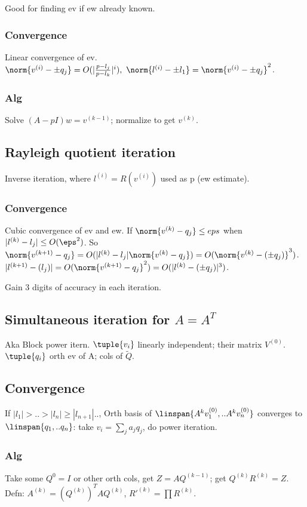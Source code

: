 \documentclass[10pt]{amsart}
\begin{document}
Good for finding ev if ew already known.

\subsubsection{Convergence}
Linear convergence of ev. \\
$\norm{v^{(i)} - \pm q_{j}} = O(|\frac{p-l_{j}}{p-l_{k}}|^{i}),\ \norm{l^{(i)} - \pm l_{1}} = \norm{v^{(i)} - \pm q_{j}}^{2}$.

\subsubsection{Alg}
Solve $(A-pI)w = v^{(k-1)}$; normalize to get $v^{(k)}$.

\subsection{Rayleigh quotient iteration}
Inverse iteration, where $l^{(i)} = R(v^{(i)})$ used as p (ew estimate).

\subsubsection{Convergence}
Cubic convergence of ev and ew. If $\norm{v^{(k)} - q_{j}} \leq eps$ when $|l^{(k)} - l_{j}| \leq O(\eps^{2})$. So $\norm{v^{(k+1)} - q_{j}} = \\
O(|l^{(k)} - l_{j}|\norm{v^{(k)} - q_{j}}) = O(\norm{v^{(k)} - (\pm q_{j})}^{3})$. $|l^{(k+1)} - (l_{j})| = O(\norm{v^{(k+1)} - q_{j}}^{2}) = O(|l^{(k)} - (\pm q_{j})|^{3})$.

Gain 3 digits of accuracy in each iteration.

\subsection{Simultaneous iteration for $A=A^{T}$}
Aka Block power itern. $\tuple{v_{i}}$ linearly independent; their matrix $V^{(0)}$. $\tuple{q_{i}}$ orth ev of A; cols of $\tilde{Q}$.

\subsection{Convergence}
If $|l_{1}| > .. > |l_{n}| \geq |l_{n+1}|..$, Orth basis of $\linspan{A^{k}v_{1}^{(0)}, .. A^{k}v_{n}^{(0)}}$ converges to $\linspan{q_{1}, .. q_{n}}$: take $v_{i} = \sum_{j}a_{j}q_{j}$, do power iteration.

\subsubsection{Alg}
Take some $Q^{0} = I$ or other orth cols, get $Z = AQ^{(k-1)}$; get $Q^{(k)}R^{(k)} = Z$. Defn: $A^{(k)} = (Q^{(k)})^{T}AQ^{(k)}$, $R'^{(k)} = \prod R^{(k)}$.
\end{document}
